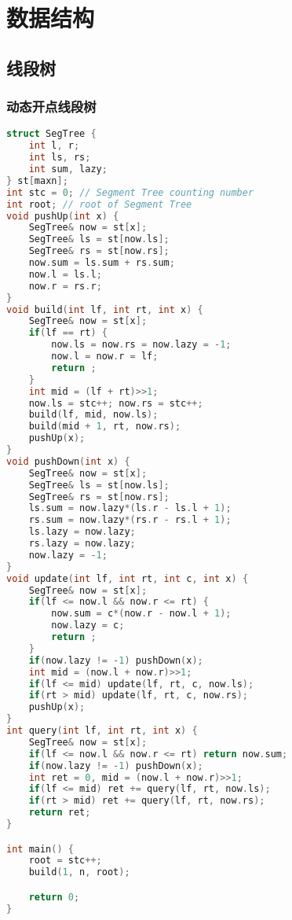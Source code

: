 

\section{数据结构}

\subsection{线段树}

\subsubsection{动态开点线段树}

\begin{lstlisting}[language=C++]
struct SegTree {
    int l, r;
    int ls, rs;
    int sum, lazy;
} st[maxn];
int stc = 0; // Segment Tree counting number
int root; // root of Segment Tree
void pushUp(int x) {
    SegTree& now = st[x];
    SegTree& ls = st[now.ls];
    SegTree& rs = st[now.rs];
    now.sum = ls.sum + rs.sum;
    now.l = ls.l;
    now.r = rs.r;
}
void build(int lf, int rt, int x) {
    SegTree& now = st[x];
    if(lf == rt) {
        now.ls = now.rs = now.lazy = -1;
        now.l = now.r = lf;
        return ;
    }
    int mid = (lf + rt)>>1;
    now.ls = stc++; now.rs = stc++;
    build(lf, mid, now.ls);
    build(mid + 1, rt, now.rs);
    pushUp(x);
}
void pushDown(int x) {
    SegTree& now = st[x];
    SegTree& ls = st[now.ls];
    SegTree& rs = st[now.rs];
    ls.sum = now.lazy*(ls.r - ls.l + 1);
    rs.sum = now.lazy*(rs.r - rs.l + 1);
    ls.lazy = now.lazy;
    rs.lazy = now.lazy;
    now.lazy = -1;
}
void update(int lf, int rt, int c, int x) {
    SegTree& now = st[x];
    if(lf <= now.l && now.r <= rt) {
        now.sum = c*(now.r - now.l + 1);
        now.lazy = c;
        return ;
    }
    if(now.lazy != -1) pushDown(x);
    int mid = (now.l + now.r)>>1;
    if(lf <= mid) update(lf, rt, c, now.ls);
    if(rt > mid) update(lf, rt, c, now.rs);
    pushUp(x);
}
int query(int lf, int rt, int x) {
    SegTree& now = st[x];
    if(lf <= now.l && now.r <= rt) return now.sum;
    if(now.lazy != -1) pushDown(x);
    int ret = 0, mid = (now.l + now.r)>>1;
    if(lf <= mid) ret += query(lf, rt, now.ls);
    if(rt > mid) ret += query(lf, rt, now.rs);
    return ret;
}

int main() {
    root = stc++;
    build(1, n, root);

    return 0;
}
\end{lstlisting}

